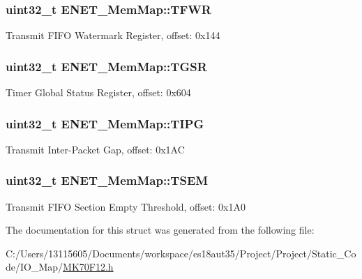 \subsubsection[{T\+F\+W\+R}]{\setlength{\rightskip}{0pt plus 5cm}uint32\+\_\+t E\+N\+E\+T\+\_\+\+Mem\+Map\+::\+T\+F\+W\+R}\label{struct_e_n_e_t___mem_map_aef8b194a94a2a24c0f705e65af5bee24}
Transmit F\+I\+F\+O Watermark Register, offset\+: 0x144 \hypertarget{struct_e_n_e_t___mem_map_af759f85ad62d7a7d8937391b0eb9f4d4}{}
\subsubsection[{T\+G\+S\+R}]{\setlength{\rightskip}{0pt plus 5cm}uint32\+\_\+t E\+N\+E\+T\+\_\+\+Mem\+Map\+::\+T\+G\+S\+R}\label{struct_e_n_e_t___mem_map_af759f85ad62d7a7d8937391b0eb9f4d4}
Timer Global Status Register, offset\+: 0x604 \hypertarget{struct_e_n_e_t___mem_map_a33c2b64aa493e8e381cd207ac9c6e8ec}{}
\subsubsection[{T\+I\+P\+G}]{\setlength{\rightskip}{0pt plus 5cm}uint32\+\_\+t E\+N\+E\+T\+\_\+\+Mem\+Map\+::\+T\+I\+P\+G}\label{struct_e_n_e_t___mem_map_a33c2b64aa493e8e381cd207ac9c6e8ec}
Transmit Inter-\/\+Packet Gap, offset\+: 0x1\+A\+C \hypertarget{struct_e_n_e_t___mem_map_a8cb50de4da08a100de4f82ddc5f4eb9e}{}
\subsubsection[{T\+S\+E\+M}]{\setlength{\rightskip}{0pt plus 5cm}uint32\+\_\+t E\+N\+E\+T\+\_\+\+Mem\+Map\+::\+T\+S\+E\+M}\label{struct_e_n_e_t___mem_map_a8cb50de4da08a100de4f82ddc5f4eb9e}
Transmit F\+I\+F\+O Section Empty Threshold, offset\+: 0x1\+A0 

The documentation for this struct was generated from the following file\+:\begin{DoxyCompactItemize}
\item 
C\+:/\+Users/13115605/\+Documents/workspace/es18aut35/\+Project/\+Project/\+Static\+\_\+\+Code/\+I\+O\+\_\+\+Map/\hyperlink{_m_k70_f12_8h}{M\+K70\+F12.\+h}\end{DoxyCompactItemize}
